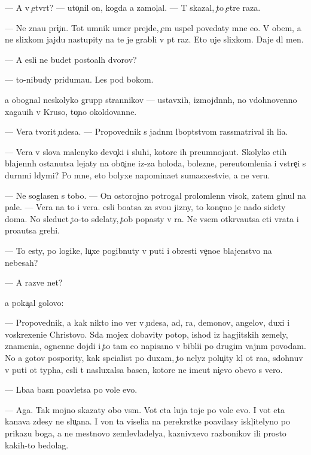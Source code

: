 \documentclass[10pt]{book}
\begin{document}
— A v {\c}etv{\e}rt{\yi}{\y}? — uto{\c}nil on, kogda {\y}a zamol{\c}al. — T{\yi} skazal, {\c}to {\c}et{\yi}re raza.

— Ne zna{\y}u pri{\c}in{\yi}. Tot umnik umer prejde, {\c}em uspel povedaty mne {\y}e{\y}o. V ob{\x}em, {\y}a ne slixkom jajdu nastupity na te je grabli v p{\ia}t{\yi}{\y} raz. Eto uje slixkom. Daje dl{\ia} men{\ia}.

— A {\y}esli ne budet posto{\y}al{\yi}h dvorov?

— {\C}to-nibudy priduma{\y}u. Les pod bokom.

{\Y}a obognal neskolyko grupp strannikov — ustavxih, izmojd{\e}nn{\yi}h, no vdohnovenno xaga{\y}u{\x}ih v Kruso, to{\c}no okoldovann{\yi}{\y}e.

— Vera tvorit {\c}udesa. — Propovednik s jadn{\yi}m l{\iu}bop{\yi}tstvom rassmatrival ih li{\q}a.

— Vera v slova malenyko{\y} devo{\c}ki i sluhi, kotor{\yi}{\y}e ih preumnoja{\y}ut. Skolyko etih blajenn{\yi}h ostanutsa lejaty na obo{\c}ine iz-za holoda, bolezne{\y}, pereutomleni{\y}a i vstre{\c}i s durn{\yi}mi l{\iu}dymi? Po mne, eto bolyxe napomina{\y}et sumasxestvi{\y}e, a ne veru.

— Ne soglasen s tobo{\y}. — On ostorojno potrogal prolomlenn{\yi}{\y} visok, zatem gl{\ia}nul na pale{\q}. — Vera na to i vera. {\Y}esli bo{\y}atsa za svo{\y}u jizny, to kone{\c}no je nado sidety doma. No sledu{\y}et {\c}to-to sdelaty, {\c}tob{\yi} popasty v ra{\y}. Ne vsem otkr{\yi}va{\y}utsa eti vrata i pro{\x}a{\y}utsa grehi.

— To {\y}esty, po logike, lu{\c}xe pogibnuty v puti i obresti ve{\c}no{\y}e blajenstvo na nebesah?

— A razve net?

{\Y}a poka{\c}al golovo{\y}:

— Propovednik, {\y}a kak nikto ino{\y} ver{\iu} v {\c}udesa, ad, ra{\y}, demonov, angelov, duxi i voskrexeni{\y}e Christovo. S{\iu}da mojex dobavity potop, ishod iz hagjitskih zemely, znameni{\y}a, ognenn{\yi}{\y}e dojdi i {\c}to tam {\y}e{\x}o napisano v bibli{\y}i po drugim vajn{\yi}m povodam. No {\y}a gotov pospority, kak spe{\q}ialist po duxam, {\c}to nelyz{\ia} polu{\c}ity kl{\iu}{\c} ot ra{\y}a, sdohnuv v puti ot typha, {\y}esli t{\yi} nasluxalsa basen, kotor{\yi}{\y}e ne ime{\y}ut ni{\c}evo ob{\x}evo s vero{\y}.

— L{\iu}ba{\y}a basn{\ia} po{\y}avl{\ia}{\y}etsa po vole {\Y}evo.

— Aga. Tak mojno skazaty obo vs{\e}m. Vot eta luja toje po vole {\y}evo. I vot eta kanava zdesy ne slu{\c}a{\y}na. I von ta viseli{\q}a na perekr{\e}stke po{\y}avilasy iskl{\iu}{\c}itelyno po prikazu boga, a ne mestnovo zemlevladely{\q}a, kaznivxevo razbo{\y}nikov ili prosto kakih-to bedolag.
\end{document}
